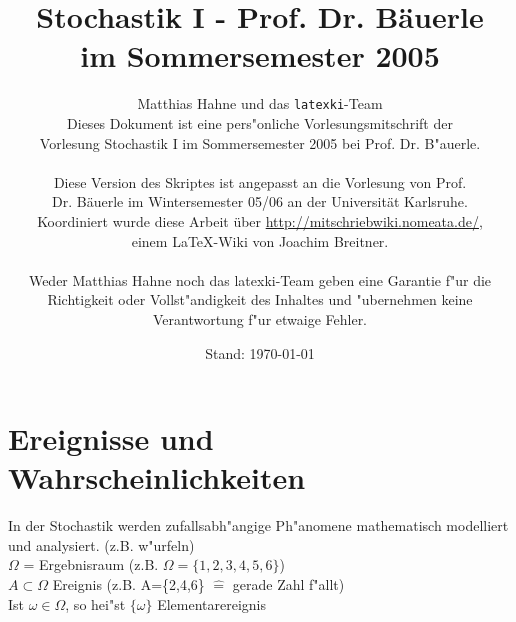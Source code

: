 \documentclass[a4paper,11pt]{book}
\title{Stochastik I - Prof. Dr. Bäuerle\\
		im Sommersemester 2005}
\author{Matthias Hahne und das \texttt{latexki}-Team\\[8 cm]
Dieses Dokument ist eine pers"onliche Vorlesungsmitschrift der \\
Vorlesung Stochastik I im Sommersemester 2005 bei Prof. Dr. B"auerle. \\
\\
Diese Version des Skriptes ist angepasst an die Vorlesung von Prof.\\
Dr. Bäuerle im Wintersemester 05/06 an der Universität Karlsruhe.\\
Koordiniert wurde diese Arbeit über \url{http://mitschriebwiki.nomeata.de/},\\
einem \LaTeX-Wiki von Joachim Breitner.\\
\\
Weder Matthias Hahne noch das latexki-Team geben eine Garantie f"ur die \\
Richtigkeit oder Vollst"andigkeit des Inhaltes und "ubernehmen keine\\
Verantwortung f"ur etwaige Fehler.
}
\date{Stand: \today}
\theoremstyle{nonumberplain}
\begin{document}
\thispagestyle{empty}
\maketitle
\newpage
\thispagestyle{empty}
\tableofcontents
\thispagestyle{empty}

\chapter{Ereignisse und Wahrscheinlichkeiten}

\setcounter{page}{1}
In der Stochastik werden zufallsabh"angige Ph"anomene mathematisch modelliert und analysiert. (z.B. w"urfeln)\\
$\Omega$ = Ergebnisraum (z.B. $\Omega = \{1,2,3,4,5,6\}$)\\
$A\subset \Omega$ Ereignis (z.B. A=\{2,4,6\} $\hat{=}$  gerade Zahl f"allt)\\
Ist $\omega \in \Omega$, so hei"st $\{\omega\}$ Elementarereignis
\end{document}
